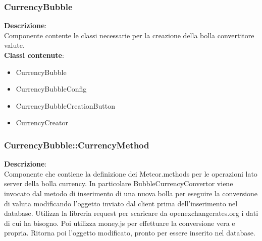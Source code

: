 \subsubsection{CurrencyBubble}
   \FloatBarrier
\FloatBarrier
\textbf{Descrizione}:\\
 Componente contente le classi necessarie per la creazione della bolla convertitore valute. 
\\ \textbf{Classi contenute}:\\
\begin{itemize}
\item CurrencyBubble
\item CurrencyBubbleConfig
\item CurrencyBubbleCreationButton
\item CurrencyCreator
\end{itemize}


\clearpage

\subsubsection{CurrencyBubble::CurrencyMethod}
\textbf{Descrizione}:\\
 Componente che contiene la definizione dei Meteor.methods per le operazioni lato server della bolla currency.  In particolare BubbleCurrencyConvertor viene invocato dal metodo di inserimento di una nuova bolla per eseguire la conversione di valuta modificando l'oggetto inviato dal client prima dell'inserimento nel database. Utilizza la libreria request per scaricare da openexchangerates.org i dati di cui ha bisogno. Poi utilizza money.js per effettuare la conversione vera e propria. Ritorna poi l'oggetto modificato, pronto per essere inserito nel database. 



